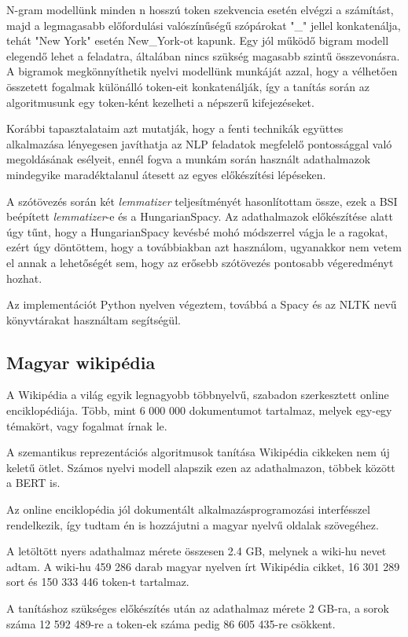 N-gram modellünk minden n hosszú token szekvencia esetén elvégzi a számítást, majd a legmagasabb előfordulási valószínűségű szópárokat "\_" jellel konkatenálja, tehát "New York" esetén New\_York-ot kapunk. Egy jól működő bigram modell elegendő lehet a feladatra, általában nincs szükség magasabb szintű összevonásra. A bigramok megkönnyíthetik nyelvi modellünk munkáját azzal, hogy a vélhetően összetett fogalmak különálló token-eit konkatenálják, így a tanítás során az algoritmusunk egy token-ként kezelheti a népszerű kifejezéseket.

Korábbi tapasztalataim azt mutatják, hogy a fenti technikák együttes alkalmazása lényegesen javíthatja az NLP feladatok megfelelő pontossággal való megoldásának esélyeit, ennél fogva a munkám során használt adathalmazok mindegyike maradéktalanul átesett az egyes előkészítési lépéseken.

A szótövezés során két \textit{lemmatizer} teljesítményét hasonlítottam össze, ezek a BSI beépített \textit{lemmatizer}-e és a HungarianSpacy. Az adathalmazok előkészítése alatt úgy tűnt, hogy a HungarianSpacy kevésbé mohó módszerrel vágja le a ragokat, ezért úgy döntöttem, hogy a továbbiakban azt használom, ugyanakkor nem vetem el annak a lehetőségét sem, hogy az erősebb szótövezés pontosabb végeredményt hozhat. 

Az implementációt Python nyelven végeztem, továbbá a Spacy és az NLTK nevű könyvtárakat használtam segítségül.

\subsection{Magyar wikipédia}
A Wikipédia a világ egyik legnagyobb többnyelvű, szabadon szerkesztett online enciklopédiája. Több, mint 6 000 000 dokumentumot tartalmaz, melyek egy-egy témakört, vagy fogalmat írnak le.

A szemantikus reprezentációs algoritmusok tanítása Wikipédia cikkeken nem új keletű ötlet. Számos nyelvi modell alapszik ezen az adathalmazon, többek között a BERT is.

Az online enciklopédia jól dokumentált alkalmazásprogramozási interfésszel rendelkezik, így tudtam én is hozzájutni a magyar nyelvű oldalak szövegéhez.

A letöltött nyers adathalmaz mérete összesen 2.4 GB, melynek a wiki-hu nevet adtam. A wiki-hu 459 286 darab magyar nyelven írt Wikipédia cikket, 16 301 289 sort és 150 333 446 token-t tartalmaz. 

A tanításhoz szükséges előkészítés után az adathalmaz mérete 2 GB-ra, a sorok száma 12 592 489-re a token-ek száma pedig 86 605 435-re csökkent.

